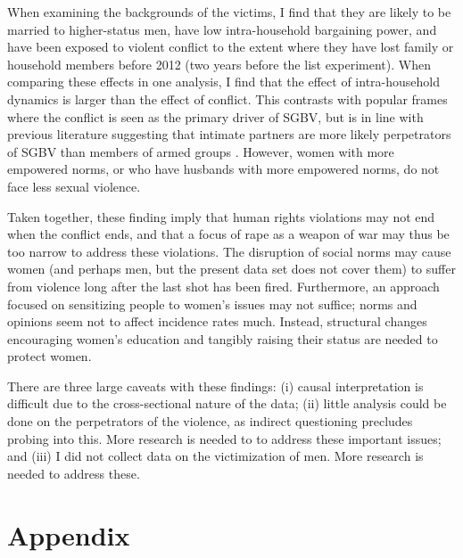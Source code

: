 \documentclass[10pt,a4paper,abstract=on]{scrartcl} %
\begin{document}
When examining the backgrounds of the victims, I find that they are likely to be married to higher-status men, have low intra-household bargaining power, and have been exposed to violent conflict to the extent where they have lost family or household members before 2012 (two years before the list experiment). When comparing these effects in one analysis, I find that the effect of intra-household dynamics is larger than the effect of conflict. This contrasts with popular frames where the conflict is seen as the primary driver of SGBV, but is in line with previous literature suggesting that intimate partners are more likely perpetrators of SGBV than members of armed groups \citep[see e.g.][]{Peterman2011}. However, women with more empowered norms, or who have husbands with more empowered norms, do not face less sexual violence.

Taken together, these finding imply that human rights violations may not end when the conflict ends, and that a focus of rape as a weapon of war may thus be too narrow to address these violations. The disruption of social norms may cause women (and perhaps men, but the present data set does not cover them) to suffer from violence long after the last shot has been fired. Furthermore, an approach focused on sensitizing people to women's issues may not suffice; norms and opinions seem not to affect incidence rates much. Instead, structural changes encouraging women's education and tangibly raising their status are needed to protect women.

There are three large caveats with these findings: (i) causal interpretation is difficult due to the cross-sectional nature of the data; (ii) little analysis could be done on the perpetrators of the violence, as indirect questioning precludes probing into this. More research is needed to  to address these important issues; and (iii) I did not  collect data on the victimization of men. More research is needed to address these.

\clearpage 



\clearpage
\section*{Appendix}
\setcounter{table}{0}
\renewcommand{\thetable}{A\arabic{table}}
\end{document}
